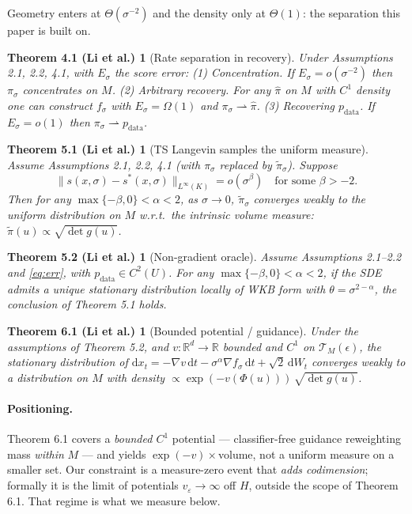 \documentclass[10pt]{article}
\theoremstyle{definition}
\theoremstyle{plain}
\newtheorem*{thmB}{Theorem 4.1 (Li et al.)}
\newtheorem*{thmC}{Theorem 5.1 (Li et al.)}
\newtheorem*{thmD}{Theorem 5.2 (Li et al.)}
\newtheorem*{thmE}{Theorem 6.1 (Li et al.)}
\newcommand{\pdata}{p_{\mathrm{data}}}
\newcommand{\R}{\mathbb{R}}
\newcommand{\TM}{\mathcal{T}_M}
\begin{document}
\noindent
Geometry enters at $\Theta(\sigma^{-2})$ and the density only at $\Theta(1)$:
the separation this paper is built on.

\begin{thmB}[Rate separation in recovery]
Under Assumptions 2.1, 2.2, 4.1, with $E_\sigma$ the score error:
\emph{(1) Concentration.} If $E_\sigma = o(\sigma^{-2})$ then $\pi_\sigma$
concentrates on $M$.
\emph{(2) Arbitrary recovery.} For any $\hat\pi$ on $M$ with $C^1$ density one
can construct $f_\sigma$ with $E_\sigma = \Omega(1)$ and
$\pi_\sigma \rightharpoonup \hat\pi$.
\emph{(3) Recovering $\pdata$.} If $E_\sigma = o(1)$ then
$\pi_\sigma \rightharpoonup \pdata$.
\end{thmB}

\begin{thmC}[TS Langevin samples the uniform measure]
Assume Assumptions 2.1, 2.2, 4.1 (with $\pi_\sigma$ replaced by
$\tilde\pi_\sigma$). Suppose
\begin{equation}
\|s(x,\sigma) - s^*(x,\sigma)\|_{L^\infty(K)} = o(\sigma^{\beta})
\quad\text{for some } \beta > -2 .
\label{eq:err}
\end{equation}
Then for any $\max\{-\beta,0\} < \alpha < 2$, as $\sigma \to 0$,
$\tilde\pi_\sigma$ converges weakly to the uniform distribution on $M$ w.r.t.\
the intrinsic volume measure: $\tilde\pi(u) \propto \sqrt{\det g(u)}$.
\end{thmC}

\begin{thmD}[Non-gradient oracle]
Assume Assumptions 2.1--2.2 and \eqref{eq:err}, with $\pdata \in C^2(U)$. For any
$\max\{-\beta,0\} < \alpha < 2$, if the SDE admits a unique stationary
distribution locally of WKB form with $\theta = \sigma^{2-\alpha}$, the
conclusion of Theorem 5.1 holds.
\end{thmD}

\begin{thmE}[Bounded potential / guidance]
Under the assumptions of Theorem 5.2, and $v : \R^d \to \R$ bounded and $C^1$ on
$\TM(\epsilon)$, the stationary distribution of
$\mathrm{d}x_t = -\nabla v\, \mathrm{d}t - \sigma^\alpha \nabla f_\sigma\, \mathrm{d}t + \sqrt2\, \mathrm{d}W_t$
converges weakly to a distribution on $M$ with density
$\propto \exp(-v(\Phi(u)))\, \sqrt{\det g(u)}$.
\end{thmE}

\paragraph{Positioning.} Theorem 6.1 covers a \emph{bounded $C^1$} potential ---
classifier-free guidance reweighting mass \emph{within} $M$ --- and yields
$\exp(-v)\times$volume, not a uniform measure on a smaller set. Our constraint is
a measure-zero event that \emph{adds codimension}; formally it is the limit of
potentials $v_\varepsilon \to \infty$ off $H$, outside the scope of Theorem 6.1.
That regime is what we measure below.
\end{document}
